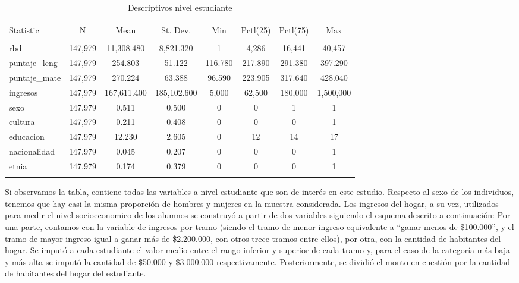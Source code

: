 \documentclass[
]{article}
\begin{document}
\begin{table}[!htbp] \centering 
  \caption{Descriptivos nivel estudiante} 
  \label{} 
\begin{tabular}{@{\extracolsep{5pt}}lccccccc} 
\\[-1.8ex]\hline 
\hline \\[-1.8ex] 
Statistic & \multicolumn{1}{c}{N} & \multicolumn{1}{c}{Mean} & \multicolumn{1}{c}{St. Dev.} & \multicolumn{1}{c}{Min} & \multicolumn{1}{c}{Pctl(25)} & \multicolumn{1}{c}{Pctl(75)} & \multicolumn{1}{c}{Max} \\ 
\hline \\[-1.8ex] 
rbd & 147,979 & 11,308.480 & 8,821.320 & 1 & 4,286 & 16,441 & 40,457 \\ 
puntaje\_leng & 147,979 & 254.803 & 51.122 & 116.780 & 217.890 & 291.380 & 397.290 \\ 
puntaje\_mate & 147,979 & 270.224 & 63.388 & 96.590 & 223.905 & 317.640 & 428.040 \\ 
ingresos & 147,979 & 167,611.400 & 185,102.600 & 5,000 & 62,500 & 180,000 & 1,500,000 \\ 
sexo & 147,979 & 0.511 & 0.500 & 0 & 0 & 1 & 1 \\ 
cultura & 147,979 & 0.211 & 0.408 & 0 & 0 & 0 & 1 \\ 
educacion & 147,979 & 12.230 & 2.605 & 0 & 12 & 14 & 17 \\ 
nacionalidad & 147,979 & 0.045 & 0.207 & 0 & 0 & 0 & 1 \\ 
etnia & 147,979 & 0.174 & 0.379 & 0 & 0 & 0 & 1 \\ 
\hline \\[-1.8ex] 
\end{tabular} 
\end{table}

Si observamos la tabla, contiene todas las variables a nivel estudiante
que son de interés en este estudio. Respecto al sexo de los individuos,
tenemos que hay casi la misma proporción de hombres y mujeres en la
muestra considerada. Los ingresos del hogar, a su vez, utilizados para
medir el nivel socioeconomico de los alumnos se construyó a partir de
dos variables siguiendo el esquema descrito a continuación: Por una
parte, contamos con la variable de ingresos por tramo (siendo el tramo
de menor ingreso equivalente a ``ganar menos de \$100.000'', y el tramo
de mayor ingreso igual a ganar más de \$2.200.000, con otros trece
tramos entre ellos), por otra, con la cantidad de habitantes del hogar.
Se imputó a cada estudiante el valor medio entre el rango inferior y
superior de cada tramo y, para el caso de la categoría más baja y más
alta se imputó la cantidad de \$50.000 y \$3.000.000 respectivamente.
Posteriormente, se dividió el monto en cuestión por la cantidad de
habitantes del hogar del estudiante.
\end{document}
